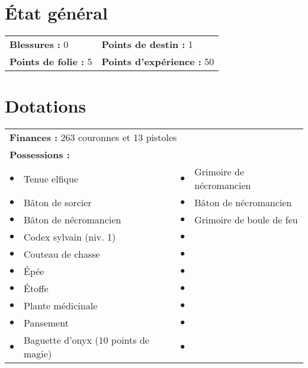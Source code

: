 \documentclass{scrartcl}
\begin{document}
\section*{{\'E}tat général}

\begin{tabular}{X{\arrlenZ} X{\arrlenZ}}
\textbf{Blessures :} 0 & \textbf{Points de destin :} 1 \\
\textbf{Points de folie :} 5 & \textbf{Points d'expérience :} 50 \\
\end{tabular}

\section*{Dotations}

\begin{tabular}{cX{\arrlenZ} cX{\arrlenZ}}
\multicolumn{4}{l}{\textbf{Finances :} 263 couronnes et 13 pistoles} \\
\multicolumn{4}{l}{\textbf{Possessions :}} \\
$\bullet$ & Tenue elfique & $\bullet$ & Grimoire de nécromancien \\
$\bullet$ & Bâton de sorcier & $\bullet$ & Bâton de nécromancien \\
$\bullet$ & Bâton de nécromancien & $\bullet$ &  Grimoire de boule de feu \\
$\bullet$ & Codex sylvain (niv. 1) & $\bullet$ & \\
$\bullet$ & Couteau de chasse & $\bullet$ & \\
$\bullet$ & Épée & $\bullet$ & \\
$\bullet$ & Étoffe & $\bullet$ & \\
$\bullet$ & Plante médicinale & $\bullet$ & \\
$\bullet$ & Pansement & $\bullet$ & \\
$\bullet$ & Baguette d'onyx (10 points de magie) & $\bullet$ & \\
\end{tabular}
\end{document}
